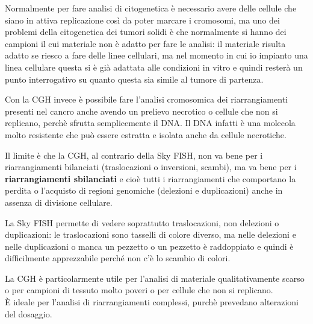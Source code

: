 \documentclass[11pt]{book}
\begin{document}
Normalmente per fare analisi di citogenetica è necessario avere delle cellule che siano in attiva replicazione così da poter marcare i cromosomi, ma uno dei problemi della citogenetica dei tumori solidi è che normalmente si hanno dei campioni il cui materiale non è adatto per fare le analisi: il materiale risulta adatto se riesco a fare delle linee cellulari, ma nel momento in cui io impianto una linea cellulare questa si è già adattata alle condizioni in vitro e quindi resterà un punto interrogativo su quanto questa sia simile al tumore di partenza.

Con la CGH invece è possibile fare l’analisi cromosomica dei riarrangiamenti presenti nel cancro anche avendo un prelievo necrotico o cellule che non si replicano, perchè sfrutta semplicemente il DNA. Il DNA infatti è una molecola molto resistente che può essere estratta e isolata anche da cellule necrotiche.

Il limite è che la CGH, al contrario della Sky FISH, non va bene per i riarrangiamenti bilanciati (traslocazioni o inversioni, scambi), ma va bene per i \textbf{riarrangiamenti sbilanciati} e cioè tutti i riarrangiamenti che comportano la perdita o l’acquisto di regioni genomiche (delezioni e duplicazioni) anche in assenza di divisione cellulare.

La Sky FISH permette di vedere soprattutto traslocazioni, non delezioni o duplicazioni: le traslocazioni sono tasselli di colore diverso, ma nelle delezioni e nelle duplicazioni o manca un pezzetto o un pezzetto è raddoppiato e quindi è difficilmente apprezzabile perché non c’è lo scambio di colori.

La CGH è particolarmente utile per l’analisi di materiale qualitativamente scarso o per campioni di tessuto molto poveri o per cellule che non si replicano.\\
È ideale per l’analisi di riarrangiamenti complessi, purchè prevedano alterazioni del dosaggio.
\end{document}

